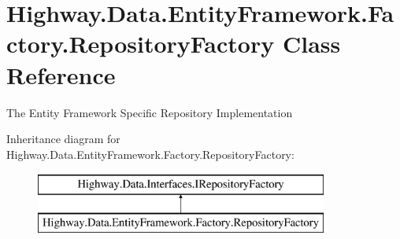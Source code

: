 \hypertarget{class_highway_1_1_data_1_1_entity_framework_1_1_factory_1_1_repository_factory}{\section{Highway.\-Data.\-Entity\-Framework.\-Factory.\-Repository\-Factory Class Reference}
\label{class_highway_1_1_data_1_1_entity_framework_1_1_factory_1_1_repository_factory}
}


The Entity Framework Specific Repository Implementation  


Inheritance diagram for Highway.\-Data.\-Entity\-Framework.\-Factory.\-Repository\-Factory\-:\begin{figure}[H]
\begin{center}
\leavevmode
\includegraphics[height=2.000000cm]{class_highway_1_1_data_1_1_entity_framework_1_1_factory_1_1_repository_factory}
\end{center}
\end{figure}
